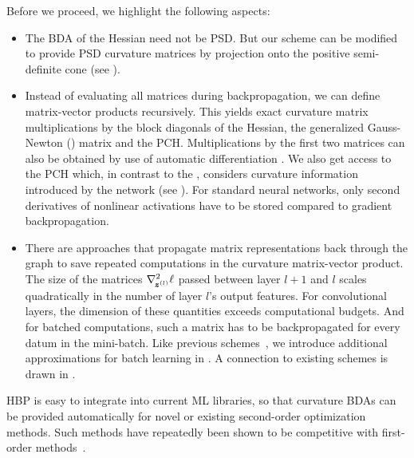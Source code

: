Before we proceed, we highlight the following aspects:
\begin{itemize}
\item The BDA of the Hessian need not be PSD. But our scheme can be modified to
  provide PSD curvature matrices by projection onto the positive semi-definite
  cone (see ).

\item Instead of evaluating all matrices during backpropagation, we can define
  matrix-vector products recursively. This yields exact curvature matrix
  multiplications by the block diagonals of the Hessian, the generalized
  Gauss-Newton (\ggn) matrix and the PCH. Multiplications by the first two
  matrices can also be obtained by use of automatic differentiation
  \citep{pearlmutter1994fast,schraudolph2002fast}. We also get access to the PCH
  which, in contrast to the \ggn, considers curvature information introduced by
  the network (see
  ). For
  standard neural networks, only second derivatives of nonlinear activations
  have to be stored compared to gradient backpropagation.

\item There are approaches \citep{botev2017practical,wei2018bdapch} that
  propagate matrix representations back through the graph to save repeated
  computations in the curvature matrix-vector product. The size of the matrices
  $\nabla_{\!{{\bm{z}}^{(l)}}}^{2}\ell$ passed between layer $l+1$ and $l$ scales
  quadratically in the number of layer $l$'s output features. For convolutional
  layers, the dimension of these quantities exceeds computational budgets. And
  for batched computations, such a matrix has to be backpropagated for every
  datum in the mini-batch. Like previous
  schemes~\citep{botev2017practical,wei2018bdapch}, we introduce additional
  approximations for batch learning in . A
  connection to existing schemes is drawn in .
\end{itemize}

HBP is easy to integrate into current ML libraries, so that curvature BDAs
can be provided automatically for novel or existing second-order optimization
methods. Such methods have repeatedly been
shown to be competitive with first-order
methods~\citep{martens2015optimizing,grosse2016kronecker,botev2017practical,zhang2017blockdiagonal,wei2018bdapch}.

